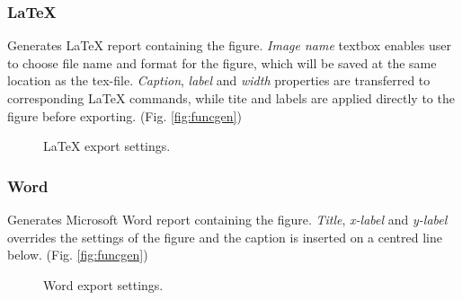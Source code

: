 \subsubsection*{LaTeX}
Generates LaTeX report containing the figure. \emph{Image name} textbox enables user to choose file name and format for the figure, which will be saved at the same location as the tex-file. \emph{Caption}, \emph{label} and \emph{width} properties are transferred to corresponding LaTeX commands, while tite and labels are applied directly to the figure before exporting. (Fig. \ref{fig:funcgen})

\begin{figure}[H]
\centering
{}
\caption{LaTeX export settings.}
\label{fig:tex}
\end{figure}

\subsubsection*{Word}
Generates Microsoft Word report containing the figure. \emph{Title}, \emph{x-label} and \emph{y-label} overrides the settings of the figure and the caption is inserted on a centred line below. (Fig. \ref{fig:funcgen})

\begin{figure}[H]
\centering
{}
\caption{Word export settings.}
\label{fig:word}
\end{figure}

\ifdefined\master
\else
	
\fi